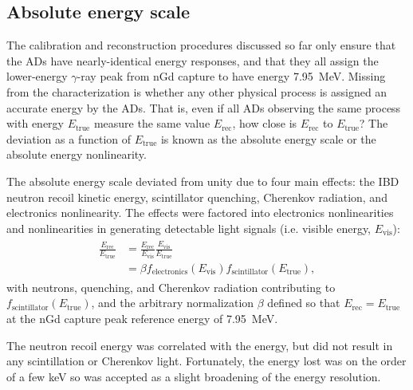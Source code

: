 \subsection{Absolute energy scale}
\label{subsec:abs_energyscale}

The calibration and reconstruction procedures discussed so far
only ensure that the ADs have nearly-identical energy responses,
and that they all assign the lower-energy $\gamma$-ray peak from nGd capture
to have energy \SI{7.95}{\MeV}.
Missing from the characterization is whether any other physical process
is assigned an accurate energy by the ADs.
That is, even if all ADs observing the same process with energy $E_{\text{true}}$
measure the same value $E_{\text{rec}}$,
how close is $E_{\text{rec}}$ to $E_{\text{true}}$?
The deviation as a function of $E_{\text{true}}$ is known as
the absolute energy scale or the absolute energy nonlinearity.

The absolute energy scale deviated from unity due to four main effects:
the IBD neutron recoil kinetic energy, scintillator quenching,
Cherenkov radiation, and electronics nonlinearity. 
The effects were factored into electronics nonlinearities
and nonlinearities in generating detectable light signals
(i.e. visible energy, $E_{\text{vis}}$):
\begin{align}
    \begin{split}
        \frac{E_{\text{rec}}}{E_{\text{true}}}
        &=
        \frac{E_{\text{rec}}}{E_{\text{vis}}}
        \frac{E_{\text{vis}}}{E_{\text{true}}} \\
        &= \beta f_{\text{electronics}}(E_{\text{vis}})
        f_{\text{scintillator}}(E_{\text{true}}),
    \end{split}
\end{align}
with neutrons, quenching, and Cherenkov radiation contributing to
$f_{\text{scintillator}}(E_{\text{true}})$,
and the arbitrary normalization $\beta$ defined so that
$E_{\text{rec}} = E_{\text{true}}$
at the nGd capture peak reference energy of \SI{7.95}{\MeV}.

The neutron recoil energy was correlated with the \nuebar{} energy,
but did not result in any scintillation or Cherenkov light.
Fortunately, the energy lost was on the order of a few \si{\keV}
so was accepted as a slight broadening of the energy resolution.

